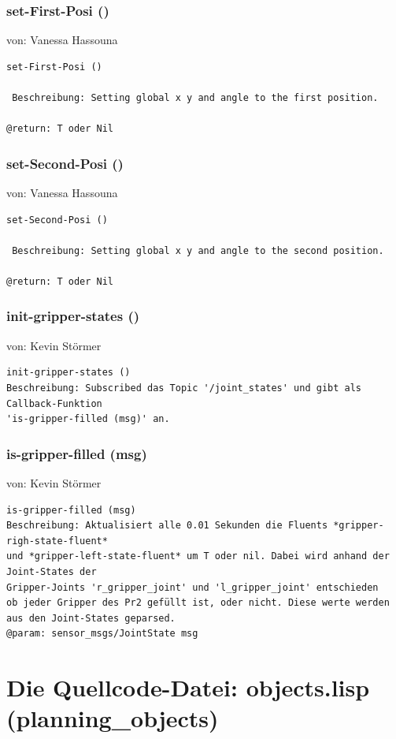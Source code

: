 \documentclass{suturo}
\makeatletter
\newcommand{\chapterauthor}[1]{%
  {\parindent0pt\vspace*{-27pt}%
  \linespread{0}\small\begin{flushright}von: #1\end{flushright}%
  \par\nobreak\vspace*{0pt}}
  \@afterheading%
}
\makeatother
\begin{document}
\subsubsection{set-First-Posi ()}
\chapterauthor{Vanessa Hassouna}
\begin{verbatim}
set-First-Posi ()

 Beschreibung: Setting global x y and angle to the first position.

@return: T oder Nil
\end{verbatim}


\subsubsection{set-Second-Posi ()}
\chapterauthor{Vanessa Hassouna}
\begin{verbatim}
set-Second-Posi ()

 Beschreibung: Setting global x y and angle to the second position.

@return: T oder Nil
\end{verbatim}





\subsubsection{init-gripper-states ()}
\chapterauthor{Kevin Störmer}
\begin{verbatim}
init-gripper-states ()
Beschreibung: Subscribed das Topic '/joint_states' und gibt als Callback-Funktion
'is-gripper-filled (msg)' an.
\end{verbatim}

\subsubsection{is-gripper-filled (msg)}
\chapterauthor{Kevin Störmer}
\begin{verbatim}
is-gripper-filled (msg)
Beschreibung: Aktualisiert alle 0.01 Sekunden die Fluents *gripper-righ-state-fluent* 
und *gripper-left-state-fluent* um T oder nil. Dabei wird anhand der Joint-States der
Gripper-Joints 'r_gripper_joint' und 'l_gripper_joint' entschieden
ob jeder Gripper des Pr2 gefüllt ist, oder nicht. Diese werte werden
aus den Joint-States geparsed.
@param: sensor_msgs/JointState msg 
\end{verbatim}



\section{Die Quellcode-Datei: objects.lisp (planning\_objects)}
\end{document}

